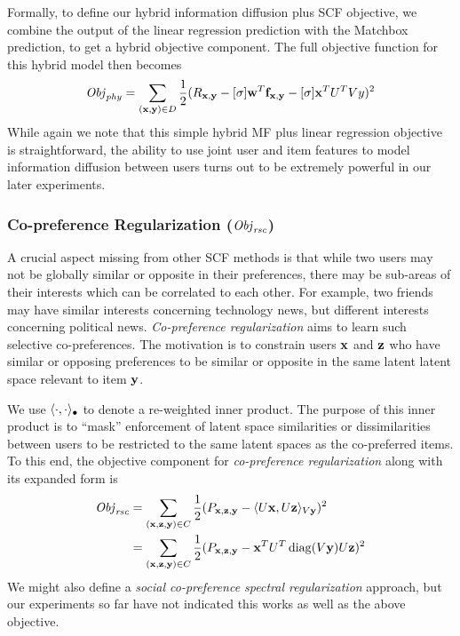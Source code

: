 Formally, to define our hybrid information diffusion plus SCF objective,
we combine the output of the linear regression prediction with the
Matchbox prediction, to get a hybrid objective component. The full
objective function for this hybrid model then becomes 
\begin{align}
\mathit{Obj}_{\mathit{phy}} = \sum_{(\mathbf{x},\mathbf{y}) \in D} \frac{1}{2} (R_{\mathbf{x},\mathbf{y}} - [\sigma] \mathbf{w}^T \mathbf{f}_{\mathbf{x},\mathbf{y}} - [\sigma] \mathbf{x}^T U^T V y)^2
\end{align}
While again we note that this simple hybrid MF plus linear regression
objective is straightforward, the ability to use joint user and item
features to model information diffusion between users turns out to be 
extremely powerful in our later experiments.

\subsubsection{Co-preference Regularization ($\mathit{Obj}_{\mathit{rsc}}$)}
\label{sec:rsc}

A crucial aspect missing from other SCF methods is that while two
users may not be globally similar or opposite in their preferences,
there may be sub-areas of their interests which can be correlated to
each other.  For example, two friends may have similar interests
concerning technology news, but different interests concerning
political news.  \emph{Co-preference regularization} aims to learn
such selective co-preferences.  The motivation is to constrain users
$\mathbf{x}$ and $\mathbf{z}$ who have similar or opposing preferences to be similar
or opposite in the same latent latent space relevant to item $\mathbf{y}$.

We use $\langle \cdot, \cdot \rangle_{\bullet}$ to denote a re-weighted inner
product. The purpose of this inner product is to ``mask'' enforcement
of latent space similarities or dissimilarities between users to be restricted
to the same latent spaces as the co-preferred items.  To this end, the
objective component for \emph{co-preference regularization} 
along with its expanded form is
\begin{align}
\mathit{Obj}_{\mathit{rsc}} & = \sum_{(\mathbf{x},\mathbf{z},\mathbf{y}) \in C} \frac{1}{2} (P_{\mathbf{x},\mathbf{z},\mathbf{y}} - \langle U\mathbf{x}, U\mathbf{z} \rangle_{V\mathbf{y}})^2 \\
& = \sum_{(\mathbf{x},\mathbf{z},\mathbf{y}) \in C} \frac{1}{2} (P_{\mathbf{x},\mathbf{z},\mathbf{y}} - \mathbf{x}^T U^T \operatorname{diag}(V\mathbf{y}) U \mathbf{z})^2 \nonumber
\end{align}
We might also define a \emph{social co-preference spectral
regularization} approach, but our experiments so far have not indicated
this works as well as the above objective.  

